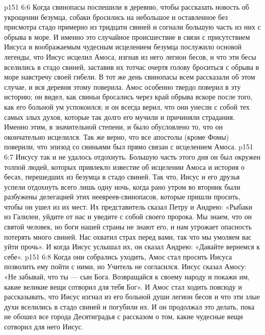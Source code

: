 \vs p151 6:6 Когда свинопасы поспешили в деревню, чтобы рассказать новость об укрощении безумца, собаки бросились на небольшое и оставленное без присмотра стадо примерно из тридцати свиней и согнали большую часть из них с обрыва в море. И именно это случайное происшествие в связи с присутствием Иисуса и воображаемым чудесным исцелением безумца послужило основой легенды, что Иисус исцелил Амоса, изгнав из него легион бесов, и что эти бесы вселились в стадо свиней, заставив их тотчас очертя голову броситься с обрыва в море навстречу своей гибели. В тот же день свинопасы всем рассказали об этом случае, и вся деревня этому поверила. Амос особенно твердо поверил в эту историю; он видел, как свиньи бросались через край обрыва вскоре после того, как его больной ум успокоился; и он всегда верил, что они унесли с собой тех самых злых духов, которые так долго его мучили и причиняли страдания. Именно этим, в значительной степени, и было обусловлено то, что он окончательно исцелился. Так же верно, что все апостолы (кроме Фомы) поверили, что эпизод со свиньями был прямо связан с исцелением Амоса.
\vs p151 6:7 \pc Иисусу так и не удалось отдохнуть. Большую часть этого дня он был окружен толпой людей, которых привлекло известие об исцелении Амоса и история о бесах, перешедших из безумца в стадо свиней. Так что, Иисус и его друзья успели отдохнуть всего лишь одну ночь, когда рано утром во вторник были разбужены делегацией этих неевреев\hyp{}свинопасов, которые пришли просить, чтобы он ушел из их мест. Их представитель сказал Петру и Андрею: «Рыбаки из Галилеи, уйдите от нас и уведите с собой своего пророка. Мы знаем, что он святой человек, но боги нашей страны не знают его, и нам угрожает опасность потерять много свиней. Нас охватил страх перед вами, так что мы умоляем вас уйти прочь». И когда Иисус услышал их, он сказал Андрею: «Давайте вернемся к себе».
\vs p151 6:8 Когда они собрались уходить, Амос стал просить Иисуса позволить ему пойти с ними, но Учитель не согласился. Иисус сказал Амосу: «Не забывай, что ты --- сын Бога. Возвращайся к своему народу и покажи им, какие великие вещи сотворил для тебя Бог». И Амос стал ходить повсюду и рассказывать, что Иисус изгнал из его больной души легион бесов и что эти злые духи вселились в стадо свиней и погубили их. И он продолжал это делать, пока не обошел все города Десятиградья с рассказом о том, какие чудесные вещи сотворил для него Иисус.
